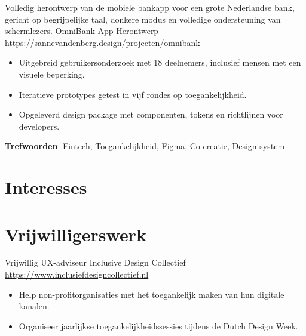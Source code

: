 \documentclass[a4paper, serif, 10pt]{moderncv}
\begin{document}
        {Volledig herontwerp van de mobiele bankapp voor een grote Nederlandse
bank, gericht op begrijpelijke taal, donkere modus en volledige
ondersteuning van schermlezers.
}
        {OmniBank App Herontwerp}
        {\url{https://sannevandenberg.design/projecten/omnibank}}
        {}
        {\begin{itemize}
\item Uitgebreid gebruikersonderzoek met 18 deelnemers, inclusief mensen met een visuele beperking.
\item Iteratieve prototypes getest in vijf rondes op toegankelijkheid.
\item Opgeleverd design package met componenten, tokens en richtlijnen voor developers.
\end{itemize}
\textbf{Trefwoorden}: Fintech, Toegankelijkheid, Figma, Co-creatie, Design system}
\section{Interesses}

\section{Vrijwilligerswerk}

        {Vrijwillig UX-adviseur}
        {Inclusive Design Collectief}
        {\url{https://www.inclusiefdesigncollectief.nl}}
        {}
        {\begin{itemize}
\item Help non-profitorganisaties met het toegankelijk maken van hun digitale kanalen.
\item Organiseer jaarlijkse toegankelijkheidssessies tijdens de Dutch Design Week.
\end{itemize}}
    
\end{document}
